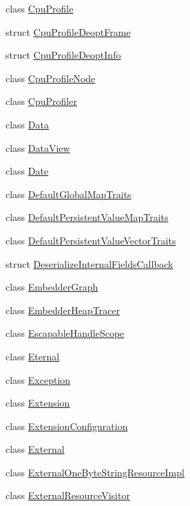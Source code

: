 \begin{DoxyCompactItemize}
class \mbox{\hyperlink{classv8_1_1CpuProfile}{Cpu\+Profile}}
\item 
struct \mbox{\hyperlink{structv8_1_1CpuProfileDeoptFrame}{Cpu\+Profile\+Deopt\+Frame}}
\item 
struct \mbox{\hyperlink{structv8_1_1CpuProfileDeoptInfo}{Cpu\+Profile\+Deopt\+Info}}
\item 
class \mbox{\hyperlink{classv8_1_1CpuProfileNode}{Cpu\+Profile\+Node}}
\item 
class \mbox{\hyperlink{classv8_1_1CpuProfiler}{Cpu\+Profiler}}
\item 
class \mbox{\hyperlink{classv8_1_1Data}{Data}}
\item 
class \mbox{\hyperlink{classv8_1_1DataView}{Data\+View}}
\item 
class \mbox{\hyperlink{classv8_1_1Date}{Date}}
\item 
class \mbox{\hyperlink{classv8_1_1DefaultGlobalMapTraits}{Default\+Global\+Map\+Traits}}
\item 
class \mbox{\hyperlink{classv8_1_1DefaultPersistentValueMapTraits}{Default\+Persistent\+Value\+Map\+Traits}}
\item 
class \mbox{\hyperlink{classv8_1_1DefaultPersistentValueVectorTraits}{Default\+Persistent\+Value\+Vector\+Traits}}
\item 
struct \mbox{\hyperlink{structv8_1_1DeserializeInternalFieldsCallback}{Deserialize\+Internal\+Fields\+Callback}}
\item 
class \mbox{\hyperlink{classv8_1_1EmbedderGraph}{Embedder\+Graph}}
\item 
class \mbox{\hyperlink{classv8_1_1EmbedderHeapTracer}{Embedder\+Heap\+Tracer}}
\item 
class \mbox{\hyperlink{classv8_1_1EscapableHandleScope}{Escapable\+Handle\+Scope}}
\item 
class \mbox{\hyperlink{classv8_1_1Eternal}{Eternal}}
\item 
class \mbox{\hyperlink{classv8_1_1Exception}{Exception}}
\item 
class \mbox{\hyperlink{classv8_1_1Extension}{Extension}}
\item 
class \mbox{\hyperlink{classv8_1_1ExtensionConfiguration}{Extension\+Configuration}}
\item 
class \mbox{\hyperlink{classv8_1_1External}{External}}
\item 
class \mbox{\hyperlink{classv8_1_1ExternalOneByteStringResourceImpl}{External\+One\+Byte\+String\+Resource\+Impl}}
\item 
class \mbox{\hyperlink{classv8_1_1ExternalResourceVisitor}{External\+Resource\+Visitor}}

\end{DoxyCompactItemize}
